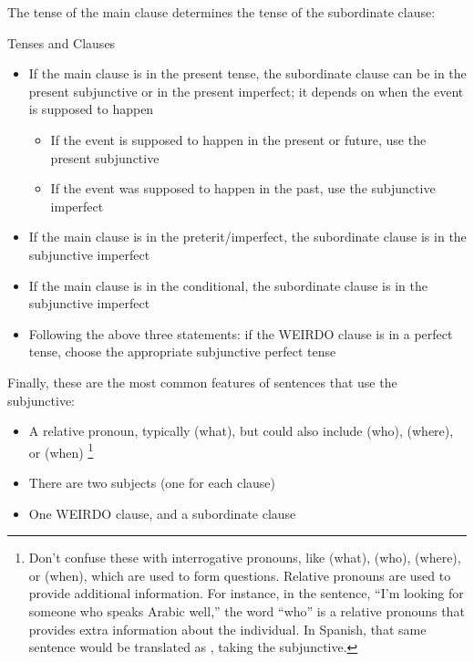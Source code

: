 The tense of the main clause determines the tense of the subordinate clause:
\begin{conf}{Tenses and Clauses}
\begin{itemize}
	\item If the main clause is in the present tense, the subordinate clause can be in the present subjunctive or in the present imperfect; it depends on when the event is supposed to happen
		\begin{itemize}[noitemsep]
			\item If the event is supposed to happen in the present or future, use the present subjunctive
			\item If the event was supposed to happen in the past, use the subjunctive imperfect
		\end{itemize}
	\item If the main clause is in the preterit/imperfect, the subordinate clause is in the subjunctive imperfect
	\item If the main clause is in the conditional, the subordinate clause is in the subjunctive imperfect
	\item Following the above three statements: if the WEIRDO clause is in a perfect tense, choose the appropriate subjunctive perfect tense
\end{itemize}
\end{conf}

Finally, these are the most common features of sentences that use the subjunctive:
\begin{itemize}[noitemsep]
	\item A relative pronoun, typically  (what), but could also include  (who),  (where), or  (when) \footnote{Don't confuse these with interrogative pronouns, like  (what),  (who),  (where), or  (when), which are used to form questions. Relative pronouns are used to provide additional information. For instance, in the sentence, ``I'm looking for someone who speaks Arabic well,'' the word ``who'' is a relative pronouns that provides extra information about the individual. In Spanish, that same sentence would be translated as , taking the subjunctive. }
	\item There are two subjects (one for each clause)
	\item One WEIRDO clause, and a subordinate clause
\end{itemize}

